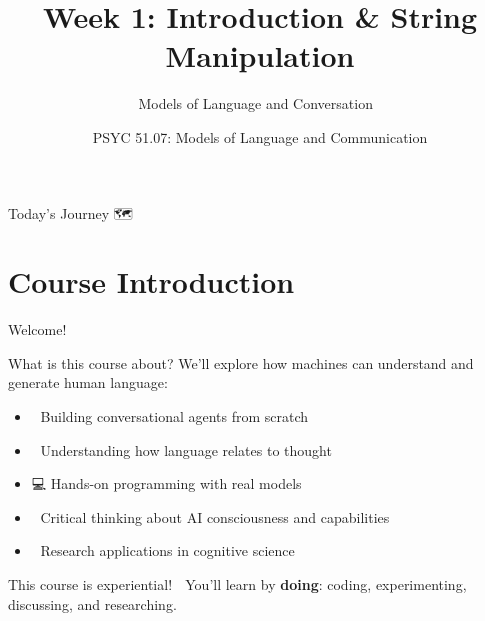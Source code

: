 \documentclass[aspectratio=169]{beamer}
\title{Week 1: Introduction \& String Manipulation}
\subtitle{Models of Language and Conversation 🤖}
\author{PSYC 51.07: Models of Language and Communication}
\institute{Dr. Jeremy R. Manning}
\date{}
\begin{document}
\begin{frame}[shrink=10]
\titlepage
\end{frame}

\begin{frame}[shrink=5]{Today's Journey 🗺️}
\tableofcontents
\end{frame}

\section{Course Introduction}

\begin{frame}{Welcome! 👋}
\small
\begin{block}{What is this course about?}
We'll explore how machines can understand and generate human language:
\begin{itemize}\setlength{\itemsep}{0pt}
    \item 🤖 Building conversational agents from scratch
    \item 🧠 Understanding how language relates to thought
    \item 💻 Hands-on programming with real models
    \item 🤔 Critical thinking about AI consciousness and capabilities
    \item 🔬 Research applications in cognitive science
\end{itemize}
\end{block}

\vspace{0.3cm}

\begin{alertblock}{This course is experiential! 🎯}
You'll learn by \textbf{doing}: coding, experimenting, discussing, and researching.
\end{alertblock}
\end{frame}
\end{document}
